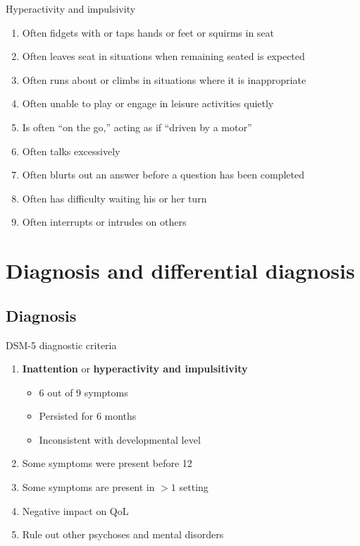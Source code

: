 \documentclass{beamer}
\begin{document}
\begin{frame}{Hyperactivity and impulsivity}
\begin{enumerate}
    \item Often fidgets with or taps hands or feet or squirms in seat
    \item Often leaves seat in situations when remaining seated is expected
    \item Often runs about or climbs in situations where it is inappropriate
    \item Often unable to play or engage in leisure activities quietly
    \item Is often ``on the go,'' acting as if ``driven by a motor''
    \item Often talks excessively
    \item Often blurts out an answer before a question has been completed
    \item Often has difficulty waiting his or her turn
    \item Often interrupts or intrudes on others
\end{enumerate}
\end{frame}

\section{Diagnosis and differential diagnosis}
\subsection{Diagnosis}
\begin{frame}{DSM-5 diagnostic criteria}
\begin{enumerate}
    \item \textbf{Inattention} or \textbf{hyperactivity and impulsitivity}
        \begin{itemize}
            \item 6 out of 9 symptoms
            \item Persisted for 6 months
            \item Inconsistent with developmental level
        \end{itemize}
    \item Some symptoms were present before 12
    \item Some symptoms are present in $>1$ setting
    \item Negative impact on QoL
    \item Rule out other psychoses and mental disorders
\end{enumerate}
\end{frame}
\end{document}

